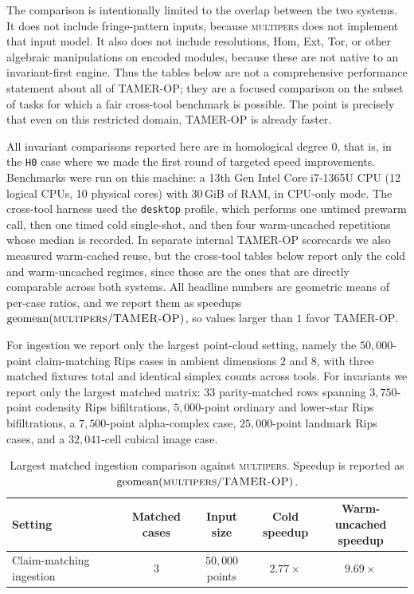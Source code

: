 \documentclass[11pt]{article}
\newcommand{\TAMER}{\textsc{TAMER-OP}}
\newcommand{\multipers}{\textsc{multipers}}
\theoremstyle{definition}
\theoremstyle{remark}
\begin{document}
The comparison is intentionally limited to the overlap between the two systems.  It does not include fringe-pattern inputs, because \multipers{} does not implement that input model.  It also does not include resolutions, Hom, Ext, Tor, or other algebraic manipulations on encoded modules, because these are not native to an invariant-first engine.  Thus the tables below are not a comprehensive performance statement about all of \TAMER{}; they are a focused comparison on the subset of tasks for which a fair cross-tool benchmark is possible.  The point is precisely that even on this restricted domain, \TAMER{} is already faster.

All invariant comparisons reported here are in homological degree \(0\), that is, in the \texttt{H0} case where we made the first round of targeted speed improvements.  Benchmarks were run on this machine: a 13th Gen Intel Core i7-1365U CPU (12 logical CPUs, 10 physical cores) with 30\,GiB of RAM, in CPU-only mode.  The cross-tool harness used the \texttt{desktop} profile, which performs one untimed prewarm call, then one timed cold single-shot, and then four warm-uncached repetitions whose median is recorded.  In separate internal \TAMER{} scorecards we also measured warm-cached reuse, but the cross-tool tables below report only the cold and warm-uncached regimes, since those are the ones that are directly comparable across both systems.  All headline numbers are geometric means of per-case ratios, and we report them as speedups \(\mathrm{geomean}(\text{\multipers{}}/\text{\TAMER{}})\), so values larger than \(1\) favor \TAMER{}.

For ingestion we report only the largest point-cloud setting, namely the \(50{,}000\)-point claim-matching Rips cases in ambient dimensions \(2\) and \(8\), with three matched fixtures total and identical simplex counts across tools.  For invariants we report only the largest matched matrix: \(33\) parity-matched rows spanning \(3{,}750\)-point codensity Rips bifiltrations, \(5{,}000\)-point ordinary and lower-star Rips bifiltrations, a \(7{,}500\)-point alpha-complex case, \(25{,}000\)-point landmark Rips cases, and a \(32{,}041\)-cell cubical image case.

\begin{table}[t]
\centering
\scriptsize
\setlength{\tabcolsep}{4pt}
\begin{tabular}{|l|c|c|c|c|}
\hline
Setting & \shortstack{Matched\\cases} & \shortstack{Input\\size} & \shortstack{Cold\\speedup} & \shortstack{Warm-uncached\\speedup} \\
\hline
Claim-matching ingestion & 3 & \(50{,}000\) points & \(2.77\times\) & \(9.69\times\) \\
\hline
\end{tabular}
\caption{Largest matched ingestion comparison against \multipers{}.  Speedup is reported as \(\mathrm{geomean}(\text{\multipers{}}/\text{\TAMER{}})\).}
\label{tab:bench-ingestion}
\end{table}
\end{document}
